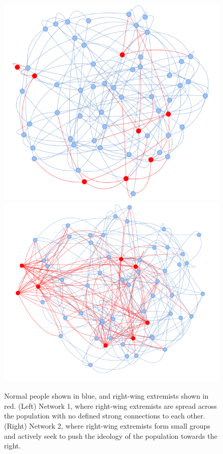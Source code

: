 \documentclass[11pt]{article}
\begin{document}
\begin{figure}[h]
    \centering
    \includegraphics[scale=0.4]{images/Network for spread right wing extremists.png}
    \hspace{1cm}
    \includegraphics[scale=0.4]{images/Network for political party simulation.png}
    \caption{Normal people shown in blue, and right-wing extremists shown in red. (Left) Network 1, where right-wing extremists are spread across the population with no defined strong connections to each other. (Right) Network 2, where right-wing extremists form small groups and actively seek to push the ideology of the population towards the right. }
\end{figure}
\end{document}
